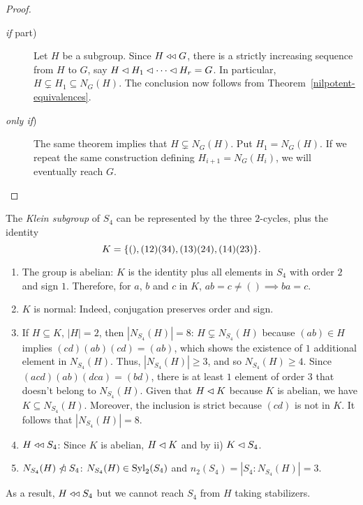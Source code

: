 \begin{proof}${}$

\begin{description}
    \item[\rm\textit{if\/} part)] Let $H$ be a subgroup. Since $H\mathrel{\triangleleft\triangleleft} G$, there is a strictly increasing sequence from $H$ to $G$, say $H\lhd H_1\lhd\cdots\lhd H_r=G$. In particular, $H\varsubsetneq H_1\subseteq N_G(H)$. The conclusion now follows from Theorem~\ref{nilpotent-equivalences}.

    \item[\rm\textit{only if\/})] The same theorem implies that $H\varsubsetneq N_G(H)$. Put $H_1=N_G(H)$. If we repeat the same construction defining $H_{i+1}=N_G(H_i)$, we will eventually reach $G$.
\end{description}
\end{proof}

\begin{xmpl}
    The \textsl{Klein subgroup} of\/ $S_4$ can be represented by the three $2$-cycles, plus the identity 
    $$
        K = \{(),(1 2)(3 4), (1 3)(2 4), (1 4)(2 3)\}.
    $$
    \begin{enumerate}[\rm i)]
        \item The group is abelian{\rm: $K$ is the identity plus all elements in $S_4$ with order $2$ and sign $1$. Therefore, for $a$, $b$ and $c$ in $K$, $ab=c\ne()\implies ba=c$.}
        
        \item $K$ is normal{\rm: Indeed, conjugation preserves order and sign.}
        
        \item If\/ $H\subseteq K$, $|H|=2$, then $|N_{S_4}(H)|=8${\rm: $H\varsubsetneq N_{S_4}(H)$ because\/ $(ab)\in H$ implies $(cd)(ab)(cd)=(ab)$, which shows the existence of\/ $1$ additional element in\/ $N_{S_4}(H)$. Thus, $|N_{S_4}(H)|\ge3$, and so\/ $N_{S_4}(H)\ge4$. Since $(acd)(ab)(dca)=(bd)$, there is at least $1$ element of order $3$ that doesn't belong to $N_{S_4}(H)$. Given that $H\lhd K$ because $K$ is abelian, we have $K\subseteq N_{S_4}(H)$. Moreover, the inclusion is strict because $(cd)$ is not in $K$. It follows that $|N_{S_4}(H)|=8$.}
    
        \item $H\mathrel{\triangleleft\triangleleft} S_4${\rm: Since\/ $K$ is abelian, $H\lhd K$ and by ii) $K\lhd S_4$.}
    
        \item $N_{S_4}(H)\nnormal S_4${\rm: $N_{S_4}(H)\in{\rm Syl}_2(S_4)$ and $n_2(S_4)=|S_4:N_{S_4}(H)|=3$.}
    \end{enumerate}
    As a result, $H\mathrel{\triangleleft\triangleleft} S_4$ but we cannot reach $S_4$ from $H$ taking stabilizers.
\end{xmpl}


